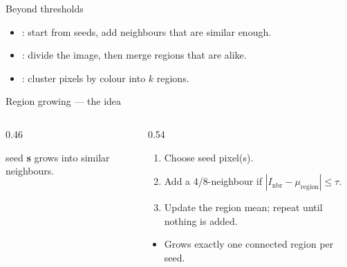 \documentclass[10pt,aspectratio=169]{beamer}
\begin{document}
\begin{frame}{Beyond thresholds}
  \begin{itemize}
    \item {}: start from seeds, add neighbours that are similar enough.
    \item {}: divide the image, then merge regions that are alike.
    \item {}: cluster pixels by colour into $k$ regions.
  \end{itemize}
\end{frame}

\begin{frame}{Region growing --- the idea}
  \begin{columns}[T]
    \begin{column}{0.46\textwidth}
      {\scriptsize seed \textbf{s} grows into similar neighbours.}
    \end{column}
    \begin{column}{0.54\textwidth}
      \begin{enumerate}
        \item Choose seed pixel(s).
        \item Add a 4/8-neighbour if $|I_\text{nbr}-\mu_\text{region}|\le\tau$.
        \item Update the region mean; repeat until nothing is added.
      \end{enumerate}
      \begin{itemize}
        \item Grows exactly one connected region per seed.
      \end{itemize}
    \end{column}
  \end{columns}
\end{frame}
\end{document}
